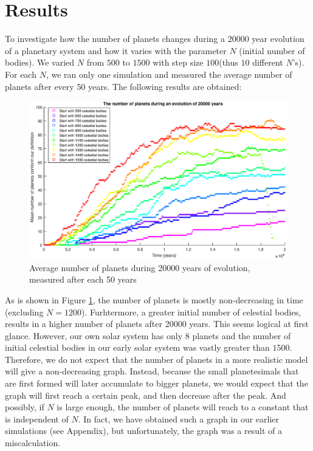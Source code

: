 \section{Results}\label{sec:results}
To investigate how the number of planets changes during a $20000$ year evolution of a planetary system and how it varies with the parameter $N$ (initial number of bodies). 
We varied $N$ from $500$ to $1500$ with step size $100$(thus $10$ different $N$'s). 
For each $N$, we ran only one simulation and measured the average number of planets after every $50$ years. The following results are obtained:

\begin{figure}[H]
\centering
\includegraphics[width=\textwidth]{AantPlanetenNieuw.eps}
\caption{Average number of planets during 20000 years of evolution, measured after each 50 years}
    \label{fig:AantPlanetenNieuw}
\end{figure}
As is shown in Figure \ref{fig:AantPlanetenNieuw}, the number of planets is mostly non-decreasing in time (excluding \(N=1200\)). 
Furhtermore, a greater initial number of celestial bodies, results in a higher number of planets after 20000 years. This seems logical at first glance. However, our own solar system has only 8 planets and the number of initial celestial bodies in our early solar system was vastly greater than  $1500$. Therefore, we do not expect that the number of planets in a more realistic model will give a non-decreasing graph.
Instead, because the small planetesimals that are first formed will later accumulate to bigger planets, we would expect that the graph will first reach a certain peak, and then decrease after the peak.
And possibly, if $N$ is large enough, the number of planets will reach to a constant that is independent of $N$. In fact, we have obtained such a graph in our earlier simulations (see Appendix), but unfortunately, the graph was a result of a miscalculation. 

